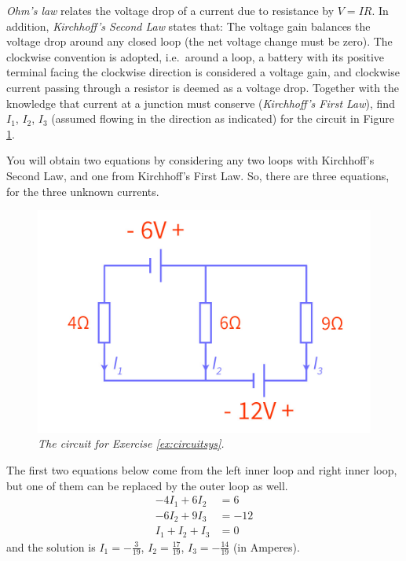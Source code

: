 \begin{Exercise}
\label{ex:circuitsys}
\textit{Ohm's law} relates the voltage drop of a current due to resistance by $V=IR$. In addition, \textit{Kirchhoff's Second Law} states that: The voltage gain balances the voltage drop around any closed loop (the net voltage change must be zero). The clockwise convention is adopted, i.e.\ around a loop, a battery with its positive terminal facing the clockwise direction is considered a voltage gain, and clockwise current passing through a resistor is deemed as a voltage drop. Together with the knowledge that current at a junction must conserve (\textit{Kirchhoff's First Law}), find $I_1$, $I_2$, $I_3$ (assumed flowing in the direction as indicated) for the circuit in Figure \ref{fig:circuitsys}. \par
You will obtain two equations by considering any two loops with Kirchhoff's Second Law, and one from Kirchhoff's First Law. So, there are three equations, for the three unknown currents.
\end{Exercise}
\begin{figure}[h!]
\centering
\includegraphics[scale = 0.25]{graphics/circuit.jpg}
\caption{\textit{The circuit for Exercise \ref{ex:circuitsys}.}}
\label{fig:circuitsys}
\end{figure}
\begin{Answer}
The first two equations below come from the left inner loop and right inner loop, but one of them can be replaced by the outer loop as well.
\begin{align*}
-4I_1 + 6I_2 &= 6\\
-6I_2 + 9I_3 &= -12\\
I_1 + I_2 + I_3 &= 0
\end{align*}
and the solution is $I_1 = -\frac{3}{19}$, $I_2 = \frac{17}{19}$, $I_3 = -\frac{14}{19}$ (in Amperes).
\end{Answer}

